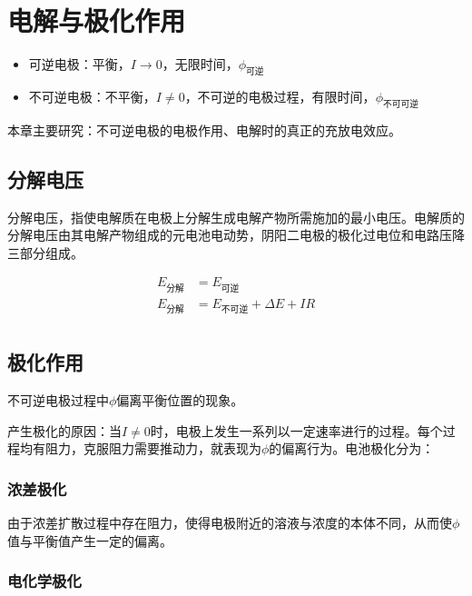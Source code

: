 \chapter{电解与极化作用}

\begin{itemize}
    \item 可逆电极：平衡，$I \to 0$，无限时间，$\phi_{\mbox{可逆}}$
    \item 不可逆电极：不平衡，$I \neq 0$，不可逆的电极过程，有限时间，$\phi_{\mbox{不可可逆}}$
\end{itemize}


本章主要研究：不可逆电极的电极作用、电解时的真正的充放电效应。



\section{分解电压}

分解电压，指使电解质在电极上分解生成电解产物所需施加的最小电压。电解质的分解电压由其电解产物组成的元电池电动势，阴阳二电极的极化过电位和电路压降三部分组成。

\begin{align*}
    E_{\mbox{分解}} &= E_{\mbox{可逆}} \\ 
    E_{\mbox{分解}} &= E_{\mbox{不可逆}} + \Delta E + IR \\ 
\end{align*}


\section{极化作用}


不可逆电极过程中$\phi$偏离平衡位置的现象。

产生极化的原因：当$I \neq 0$时，电极上发生一系列以一定速率进行的过程。每个过程均有阻力，克服阻力需要推动力，就表现为$\phi$的偏离行为。电池极化分为：

\subsection{浓差极化}

由于浓差扩散过程中存在阻力，使得电极附近的溶液与浓度的本体不同，从而使$\phi$值与平衡值产生一定的偏离。

\subsection{电化学极化}


